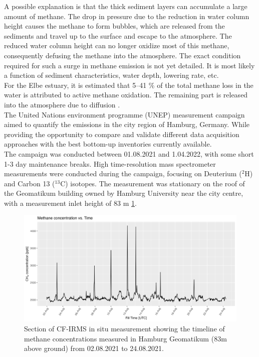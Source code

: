 A possible explanation is that the thick sediment layers can accumulate a large amount of methane. The drop in pressure due to the reduction in water column height causes the methane to form bubbles, which are released from the sediments and travel up to the surface and escape to the atmosphere. The reduced water column height can no longer oxidize most of this methane, consequently defusing the methane into the atmosphere. The exact condition required for such a surge in methane emission is not yet detailed. It is most likely a function of sediment characteristics, water depth, lowering rate, etc.\\
For the Elbe estuary, it is estimated that 5–41 \% of the total methane loss in the water is attributed to active methane oxidation. The remaining part is released into the atmosphere due to diffusion \cite{Matousu.2019}.\\
The United Nations environment programme (UNEP) measurement campaign aimed to quantify the emissions in the city region of Hamburg, Germany. While providing the opportunity to compare and validate different data acquisition approaches with the best bottom-up inventories currently available.\\
The campaign was conducted between 01.08.2021 and 1.04.2022, with some short 1-3 day maintenance breaks. High time-resolution mass spectrometer measurements were conducted during the campaign, focusing on Deuterium ($^2$H) and Carbon 13 ($^13$C) isotopes. The measurement was stationary on the roof of the Geomatikum building owned by Hamburg University near the city centre, with a measurement inlet height of 83 m \cref{TimelineNoPeaks}.
\begin{figure}[htbp]
 \centering
 \includegraphics[width=1\textwidth]{figures/Appendix/CH4_Timelines/4_CH4_Timeline0_No_Peaks.png}
 \caption[CH$_4$ Timeline]{Section of CF-IRMS in situ measurement showing the timeline of methane concentrations measured in Hamburg Geomatikum (83m above ground) from 02.08.2021 to 24.08.2021.}
 \label{TimelineNoPeaks}
\end{figure}
